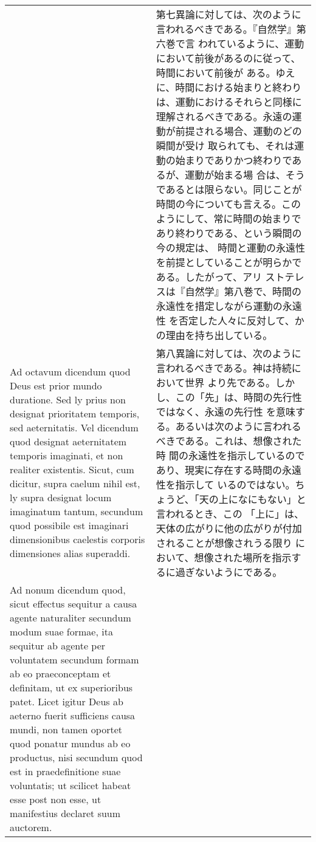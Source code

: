\documentclass[10pt]{jsarticle} %
\begin{document}
\begin{longtable}{p{21em}p{21em}}
&

第七異論に対しては、次のように言われるべきである。『自然学』第六巻で言
われているように、運動において前後があるのに従って、時間において前後が
ある。ゆえに、時間における始まりと終わりは、運動におけるそれらと同様に
理解されるべきである。永遠の運動が前提される場合、運動のどの瞬間が受け
取られても、それは運動の始まりでありかつ終わりであるが、運動が始まる場
合は、そうであるとは限らない。同じことが時間の今についても言える。この
ようにして、常に時間の始まりであり終わりである、という瞬間の今の規定は、
時間と運動の永遠性を前提としていることが明らかである。したがって、アリ
ストテレスは『自然学』第八巻で、時間の永遠性を措定しながら運動の永遠性
を否定した人々に反対して、かの理由を持ち出している。

\\



{\sc Ad octavum dicendum} quod Deus est prior mundo duratione. Sed ly prius
 non designat prioritatem temporis, sed aeternitatis. Vel dicendum quod
 designat aeternitatem temporis imaginati, et non realiter
 existentis. Sicut, cum dicitur, supra caelum nihil est, ly supra
 designat locum imaginatum tantum, secundum quod possibile est imaginari
 dimensionibus caelestis corporis dimensiones alias superaddi.

&


第八異論に対しては、次のように言われるべきである。神は持続において世界
より先である。しかし、この「先」は、時間の先行性ではなく、永遠の先行性
を意味する。あるいは次のように言われるべきである。これは、想像された時
間の永遠性を指示しているのであり、現実に存在する時間の永遠性を指示して
いるのではない。ちょうど、「天の上になにもない」と言われるとき、この
「上に」は、天体の広がりに他の広がりが付加されることが想像されうる限り
において、想像された場所を指示するに過ぎないようにである。


\\



{\sc Ad nonum dicendum} quod, sicut effectus sequitur a causa agente
 naturaliter secundum modum suae formae, ita sequitur ab agente per
 voluntatem secundum formam ab eo praeconceptam et definitam, ut ex
 superioribus patet. Licet igitur Deus ab aeterno fuerit sufficiens
 causa mundi, non tamen oportet quod ponatur mundus ab eo productus,
 nisi secundum quod est in praedefinitione suae voluntatis; ut scilicet
 habeat esse post non esse, ut manifestius declaret suum auctorem.

&


\end{longtable}
\end{document}
